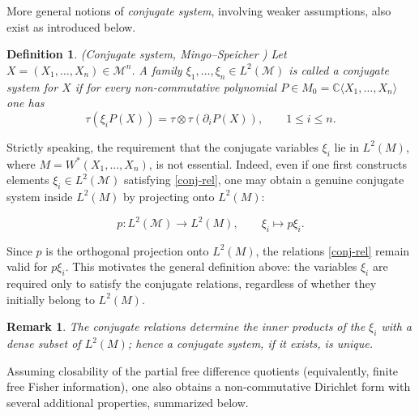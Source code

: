 \documentclass[10pt,a4paper,reqno]{amsart}
\newtheorem{definition}[theorem]{Definition}
\newtheorem{remark}[theorem]{Remark}
\begin{document}
More general notions of \emph{conjugate system}, involving weaker assumptions,
also exist as introduced below.

\begin{definition}(Conjugate system, Mingo--Speicher \cite[Definition~12]{SM})
Let $X=(X_1,\ldots,X_n)\in\mathcal{M}^n$.  
A family $\xi_1,\ldots,\xi_n\in L^2(\mathcal{M})$ is called a 
\emph{conjugate system} for $X$ if for every non-commutative polynomial 
$P\in M_0=\mathbb{C}\langle X_1,\ldots,X_n\rangle$ one has
\begin{equation}\label{conj-rel}
    \tau(\xi_iP(X))
    =
    \tau\otimes\tau(\partial_i P(X)),
    \qquad 1\le i\le n.
\end{equation}
\end{definition}

Strictly speaking, the requirement that the conjugate variables $\xi_i$ lie in 
$L^2(M)$, where $M=W^\ast(X_1,\ldots,X_n)$, is not essential.  
Indeed, even if one first constructs elements $\xi_i\in L^2(\mathcal{M})$ satisfying
\eqref{conj-rel}, one may obtain a genuine conjugate system inside $L^2(M)$ by
projecting onto $L^2(M)$:


\[
p:L^2(\mathcal{M})\longrightarrow L^2(M),
\qquad 
\xi_i\longmapsto p\xi_i.
\]


Since $p$ is the orthogonal projection onto $L^2(M)$, the relations
\eqref{conj-rel} remain valid for $p\xi_i$.  
This motivates the general definition above: the variables $\xi_i$ are required
only to satisfy the conjugate relations, regardless of whether they initially
belong to $L^2(M)$.

\begin{remark}
The conjugate relations determine the inner products of the $\xi_i$ with a dense
subset of $L^2(M)$; hence a conjugate system, if it exists, is unique.
\end{remark}

\medskip

Assuming closability of the partial free difference quotients (equivalently,
finite free Fisher information), one also obtains a non‑commutative Dirichlet
form with several additional properties, summarized below.
\end{document}
